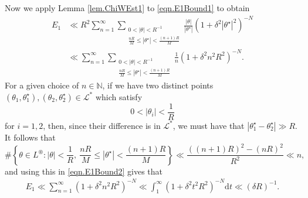 \documentclass[reqno]{amsart}
\newcommand{\N}{\mathbb{N}}
\newcommand{\mr}{\mathrm}
\newcommand{\cL}{\mathcal{L}}
\begin{document}
Now we apply Lemma \ref{lem.ChiWEst1} to \eqref{eqn.E1Bound1} to obtain
\begin{align}
	E_1&\ll R^2\sum_{n=1}^\infty\sum_{\substack{0<|\theta|<R^{-1}\\\frac{nR}{M}\le |\theta^\star|<\frac{(n+1)R}{M}}}\frac{|\theta|}{|\theta^\star|}\left(1+\delta^2|\theta^\star|^2\right)^{-N}\nonumber\\
	&\ll \sum_{n=1}^\infty\sum_{\substack{0<|\theta|<R^{-1}\\\frac{nR}{M}\le |\theta^\star|<\frac{(n+1)R}{M}}}\frac{1}{n}\left(1+\delta^2n^2R^2\right)^{-N}.\label{eqn.E1Bound2}
\end{align}
For a given choice of $n\in\N$, if we have two distinct points $(\theta_1,\theta_1^\star),(\theta_2,\theta_2^\star)\in\cL^*$ which satisfy
\[0<|\theta_i|<\frac{1}{R}\]
for $i=1, 2$, then, since their difference is in $\cL^*$, we must have that $|\theta_1^\star-\theta_2^\star|\gg R$. It follows that
\[\#\left\{\theta\in L^\circledast: |\theta|<\frac{1}{R},~ \frac{nR}{M}\le|\theta^\star|<\frac{(n+1)R}{M}\right\}\ll \frac{((n+1)R)^2-(nR)^2}{R^2}\ll n,\]
and using this in \eqref{eqn.E1Bound2} gives that
\begin{align}\label{eqn.E1Bound3}
	E_1\ll\sum_{n=1}^\infty(1+\delta^2n^2R^2)^{-N}\ll\int_{1}^\infty(1+\delta^2t^2R^2)^{-N}\mr{d}t\ll(\delta R)^{-1}.
\end{align}
\end{document}
